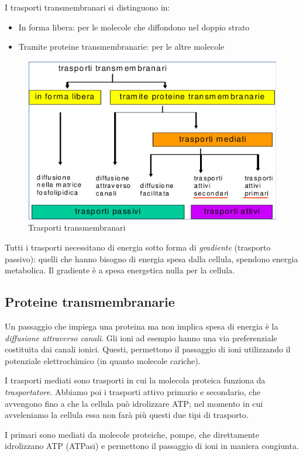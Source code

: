 \documentclass[a4paper,12pt]{article}
\begin{document}
I trasporti transmembranari si distinguono in:
\begin{itemize}
\item{In forma libera: per le molecole che diffondono nel doppio strato}
\item{Tramite proteine transmembranarie: per le altre molecole}
\end{itemize}
\begin{figure}[H]
\centering
\includegraphics[scale=0.5]{immagine/riepilogo.jpg}
\caption{Trasporti transmembranari}
\end{figure}

Tutti i trasporti necessitano di energia sotto forma di \emph{gradiente} (trasporto passivo): quelli che hanno bisogno di energia spesa dalla cellula, spendono energia metabolica. Il gradiente è a spesa energetica nulla per la cellula.

\subsection{Proteine transmembranarie}
Un passaggio che impiega una proteina ma non implica spesa di energia è la \emph{diffusione attraverso canali}.
Gli ioni ad esempio hanno una via preferenziale costituita dai canali ionici. Questi, permettono il passaggio di ioni utilizzando il potenziale elettrochimico (in quanto molecole cariche).

I trasporti mediati sono trasporti in cui la molecola proteica funziona da \emph{trasportatore}.
Abbiamo poi i trasporti attivo primario e secondario, che avvengono fino a che la cellula può idrolizzare ATP; nel momento in cui avveleniamo la cellula essa non farà
più questi due tipi di trasporto.

I primari sono mediati da molecole proteiche, pompe, che direttamente idrolizzano ATP (ATPasi) e permettono il passaggio di ioni in maniera congiunta. 
\end{document}
